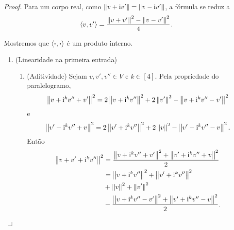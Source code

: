 \begin{proof}
Para um corpo real, como $\nor{v+\ii v'} = \nor{v-\ii v'}$, a fórmula se reduz a
	\begin{equation*}
	\inte{v}{v'} = \frac{\nor{v+v'}^2 - \nor{v-v'}^2}{4}.
	\end{equation*}

Mostremos que $\inte{\var}{\var}$ é um produto interno.
\begin{enumerate}
\item (Linearidade na primeira entrada)
	\begin{enumerate}
	\item (Aditividade) Sejam $v,v',v'' \in V$ e $k \in [4]$. Pela propriedade do paralelogramo,
		\begin{equation*}
		\nor{v+\ii^kv''+v'}^2 = 2\nor{v+\ii^kv''}^2 + 2\nor{v'}^2 - \nor{v+\ii^kv''-v'}^2
		\end{equation*}
		e
		\begin{equation*}
		\nor{v'+\ii^kv''+v}^2 = 2\nor{v'+\ii^kv''}^2 + 2\nor{v}^2 - \nor{v'+\ii^kv''-v}^2.
		\end{equation*}
	Então
		\begin{align*}
		\nor{v+v'+\ii^kv''}^2 &= \frac{\nor{v+\ii^kv''+v'}^2 + \nor{v'+\ii^kv''+v}^2}{2} \\
			&= \nor{v+\ii^kv''}^2 + \nor{v'+\ii^kv''}^2 \\
			&+ \nor{v}^2 + \nor{v'}^2 \\
			&- \frac{\nor{v+\ii^kv''-v'}^2 + \nor{v'+\ii^kv''-v}^2}{2}.
		\end{align*}
	

\end{enumerate}
\end{enumerate}
\end{proof}
